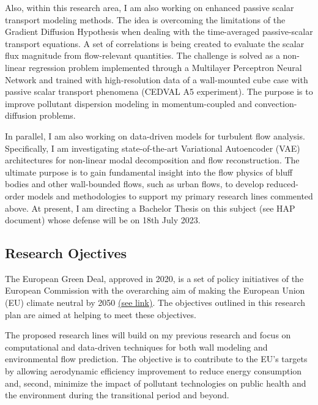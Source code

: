 \documentclass{article}
\begin{document}
\begin{itemize}
Also, within this research area, I am also working on enhanced passive scalar transport modeling methods. The idea is overcoming the limitations of the Gradient Diffusion Hypothesis when dealing with the time-averaged passive-scalar transport equations. A set of correlations is being created to evaluate the scalar flux magnitude from flow-relevant quantities. The challenge is solved as a non-linear regression problem implemented through a Multilayer Perceptron Neural Network and trained with high-resolution data of a wall-mounted cube case with passive scalar transport phenomena (CEDVAL A5 experiment). The purpose is to improve pollutant dispersion modeling in momentum-coupled and convection-diffusion problems. 

In parallel, I am also working on data-driven models for turbulent flow analysis. Specifically, I am investigating state-of-the-art Variational Autoencoder (VAE) architectures for non-linear modal decomposition and flow reconstruction. The ultimate purpose is to gain fundamental insight into the flow physics of bluff bodies and other wall-bounded flows, such as urban flows, to develop reduced-order models and methodologies to support my primary research lines commented above. At present, I am directing a Bachelor Thesis on this subject (see HAP document) whose defense will be on 18th July 2023.

\end{itemize}


\subsection{Research Ojectives}  \label{sec:res-obj}

The European Green Deal, approved in 2020, is a set of policy initiatives of the European Commission with the overarching aim of making the European Union (EU) climate neutral by 2050 \href{https://www.euractiv.com/section/energy-environment/news/eu-commission-unveils-european-green-deal-the-key-points/}{(see link)}. The objectives outlined in this research plan are aimed at helping to meet these objectives.    

The proposed research lines will build on my previous research and focus on computational and data-driven techniques for both wall modeling and environmental flow prediction. The objective is to contribute to the EU's targets by allowing aerodynamic efficiency improvement to reduce energy consumption and, second, minimize the impact of pollutant technologies on public health and the environment during the transitional period and beyond.
\end{document}
